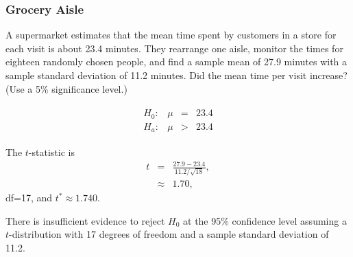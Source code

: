 \begin{frame}
  \frametitle{Grocery Aisle}

  \vspace*{-1em}

  A supermarket estimates that the mean time spent by customers in a
  store for each visit is about 23.4 minutes. They rearrange one
  aisle, monitor the times for eighteen randomly chosen people, and
  find a sample mean of 27.9 minutes with a {\color{red} sample
    standard deviation} of 11.2 minutes. Did the mean time per visit
  increase? (Use a 5\% significance level.)

  \vspace*{-1em}

    \begin{eqnarray*}
      \begin{array}{lrcl}
        H_0: & \mu & = & 23.4 \\
        H_a: & \mu & > & 23.4
      \end{array}
    \end{eqnarray*}

    The $t$-statistic is 
    \begin{eqnarray*}
      t & = & \frac{27.9-23.4}{11.2/\sqrt{18}}, \\
      & \approx & 1.70,
    \end{eqnarray*}
    df=17, and $t^*\approx 1.740$.

    \vfill

    {

      {\color{red}
        There is insufficient evidence to reject $H_0$ at the 95\%
        confidence level assuming a $t$-distribution with 17 degrees of
        freedom and a {\color{red}sample standard deviation} of 11.2.
      }

    }

  \end{frame}



